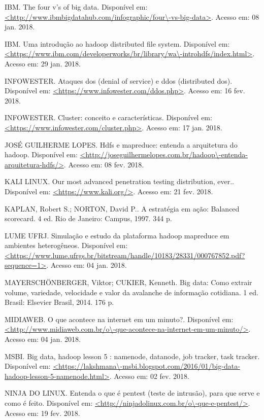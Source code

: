 \begin{thebibliography}{99}
 IBM. The four v's of big data. Disponível em: \url{<http://www.ibmbigdatahub.com/infographic/four\-vs-big-data>}. Acesso em: 08 jan. 2018.


 IBM. Uma introdução ao hadoop distributed file system. Disponível em: \url{<https://www.ibm.com/developerworks/br/library/wa\-introhdfs/index.html>}. Acesso em: 29 jan. 2018.

 INFOWESTER. Ataques dos (denial of service) e ddos (distributed dos). Disponível em: \url{<https://www.infowester.com/ddos.php>}. Acesso em: 16 fev. 2018.

 INFOWESTER. Cluster: conceito e características. Disponível em: \url{<https://www.infowester.com/cluster.php>}. Acesso em: 17 jan. 2018.

 JOSÉ GUILHERME LOPES. Hdfs e mapreduce: entenda a arquitetura do hadoop. Disponível em: \url{<http://joseguilhermelopes.com.br/hadoop\-entenda-arquitetura-hdfs/>}. Acesso em: 08 fev. 2018.

 KALI LINUX. Our most advanced penetration testing distribution, ever.. Disponível em: \url{<https://www.kali.org/>}. Acesso em: 21 fev. 2018.

 KAPLAN, Robert S.; NORTON, David P.. A estratégia em ação: Balanced scorecard. 4 ed.  Rio de Janeiro: Campus, 1997. 344 p.

 LUME UFRJ. Simulação e estudo da plataforma hadoop mapreduce em ambientes heterogêneos. Disponível em: \url{<https://www.lume.ufrgs.br/bitstream/handle/10183/28331/000767852.pdf?sequence=1>}. Acesso em: 04 jan. 2018.

 MAYER\-SCHÖNBERGER, Viktor; CUKIER, Kenneth. Big data: Como extrair volume, variedade, velocidade e valor da avalanche de informação cotidiana. 1 ed.  Brasil: Elsevier Brasil, 2014. 176 p.

 MIDIAWEB. O que acontece na internet em um minuto?. Disponível em: \url{<http://www.midiaweb.com.br/o\-que-acontece-na-internet-em-um-minuto/>}. Acesso em: 04 jan. 2018.

 MSBI. Big data, hadoop \- lesson 5 : namenode, datanode, job tracker, task tracker. Disponível em: \url{<https://lakshmana\-msbi.blogspot.com/2016/01/big-data-hadoop-lesson-5-namenode.html>}. Acesso em: 02 fev. 2018.

 NINJA DO LINUX. Entenda o que é pentest (teste de intrusão), para que serve e como é feito. Disponível em: \url{<http://ninjadolinux.com.br/o\-que-e-pentest/>}. Acesso em: 19 fev. 2018.


\end{thebibliography}
